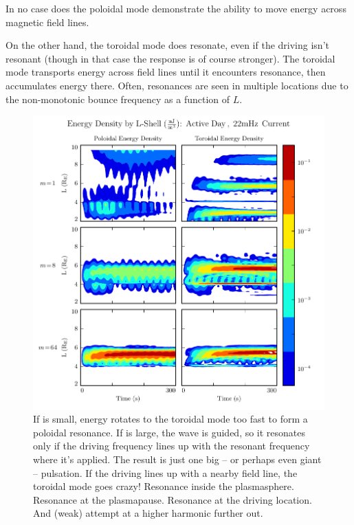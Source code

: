 In no case does the poloidal mode demonstrate the ability to move energy across magnetic field lines. 

On the other hand, the toroidal mode does resonate, even if the driving isn't resonant (though in that case the response is of course stronger). The toroidal mode transports energy across field lines until it encounters resonance, then accumulates energy there. Often, resonances are seen in multiple locations due to the non-monotonic \Alfven bounce frequency as a function of $L$. 


\begin{figure}[H]
    \centering
    \includegraphics[width=\textwidth]{figures/layers_22mHz_1.pdf}
    \caption[Poloidal and Toroidal Energy Distribution: Resonant Driving]{
      If \azm is small, energy rotates to the toroidal mode too fast to form a poloidal resonance. If \azm is large, the \Alfven wave is guided, so it resonates only if the driving frequency lines up with the resonant frequency where it's applied. The result is just one big -- or perhaps even giant -- pulsation. If the driving lines up with a nearby field line, the toroidal mode goes crazy! Resonance inside the plasmasphere. Resonance at the plasmapause. Resonance at the driving location. And (weak) attempt at a higher harmonic further out. 
    }
    \label{fig_resonant_driving}
\end{figure}

